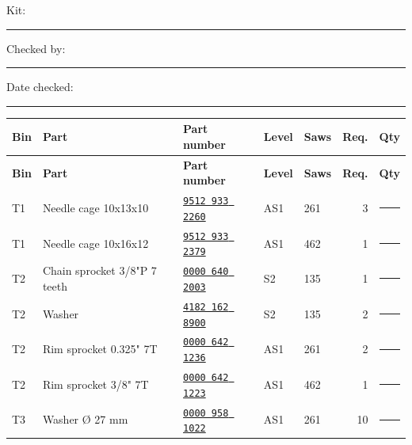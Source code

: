 \documentclass[10pt,letterpaper]{article}
\begin{document}
{\small Kit: \rule{1.1in}{0.3pt}\hfill Checked by: \rule{1.4in}{0.3pt}\hfill Date checked: \rule{1in}{0.3pt}}\par\small\renewcommand{\arraystretch}{1.9}\setlength{\tabcolsep}{4pt}\begin{longtable}{@{}l>{\raggedright\arraybackslash}p{2.58in}p{1.23in}llrr@{}}\toprule\textbf{Bin} & \textbf{Part} & \textbf{Part number} & \textbf{Level} & \textbf{Saws} & \textbf{Req.} & \textbf{Qty}\\\midrule\endfirsthead\toprule\textbf{Bin} & \textbf{Part} & \textbf{Part number} & \textbf{Level} & \textbf{Saws} & \textbf{Req.} & \textbf{Qty}\\\midrule\endhead
T1 & Needle cage 10x13x10 & \href{https://rduncangt.github.io/frk-management/parts/95129332260/}{\texttt{9512 933 2260}} & \textcolor{frkSupervision}{AS1} & \textcolor{frkApplication}{\mbox{261}} & 3 & \rule{0.23in}{0.3pt}\\

\rowcolor{black!6}T1 & Needle cage 10x16x12 & \href{https://rduncangt.github.io/frk-management/parts/95129332379/}{\texttt{9512 933 2379}} & \textcolor{frkSupervision}{AS1} & \textcolor{frkApplication}{\mbox{462}} & 1 & \rule{0.23in}{0.3pt}\\

T2 & Chain sprocket 3/8"P 7 teeth & \href{https://rduncangt.github.io/frk-management/parts/00006402003/}{\texttt{0000 640 2003}} & \textcolor{frkSupervision}{S2} & \textcolor{frkApplication}{\mbox{135}} & 1 & \rule{0.23in}{0.3pt}\\

\rowcolor{black!6}T2 & Washer & \href{https://rduncangt.github.io/frk-management/parts/41821628900/}{\texttt{4182 162 8900}} & \textcolor{frkSupervision}{S2} & \textcolor{frkApplication}{\mbox{135}} & 2 & \rule{0.23in}{0.3pt}\\

T2 & Rim sprocket 0.325" 7T & \href{https://rduncangt.github.io/frk-management/parts/00006421236/}{\texttt{0000 642 1236}} & \textcolor{frkSupervision}{AS1} & \textcolor{frkApplication}{\mbox{261}} & 2 & \rule{0.23in}{0.3pt}\\

\rowcolor{black!6}T2 & Rim sprocket 3/8" 7T & \href{https://rduncangt.github.io/frk-management/parts/00006421223/}{\texttt{0000 642 1223}} & \textcolor{frkSupervision}{AS1} & \textcolor{frkApplication}{\mbox{462}} & 1 & \rule{0.23in}{0.3pt}\\

T3 & Washer \O{} 27 mm & \href{https://rduncangt.github.io/frk-management/parts/00009581022/}{\texttt{0000 958 1022}} & \textcolor{frkSupervision}{AS1} & \textcolor{frkApplication}{\mbox{261}} & 10 & \rule{0.23in}{0.3pt}\\


\end{longtable}
\end{document}
